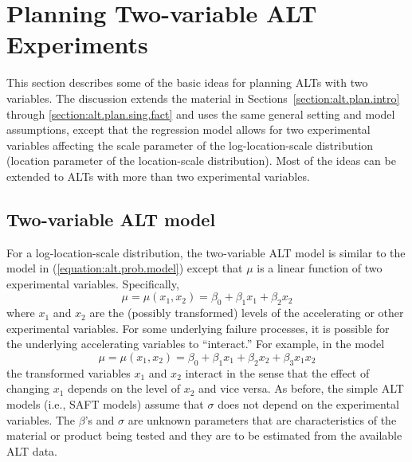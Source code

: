 \section{Planning Two-variable ALT Experiments}
\label{section:alt.plan.two.fact}

This section describes some of the basic ideas for planning ALTs with
two variables.  The discussion extends the material in
Sections~\ref{section:alt.plan.intro} through
\ref{section:alt.plan.sing.fact} and uses 
the same general setting and model assumptions, except that the
regression model allows for two experimental variables affecting the
scale parameter of the log-location-scale distribution (location
parameter of the location-scale distribution).  Most of the ideas
can be extended to ALTs with more than two experimental variables.

\subsection{Two-variable ALT model}
For a log-location-scale distribution, the two-variable ALT model is
similar to the model in (\ref{equation:alt.prob.model}) except that
$\mu$ is a linear function of two experimental variables.
Specifically,
\begin{displaymath}
\mu  =  \mu(x_{1},x_{2})=\beta_{0}+\beta_{1} x_{1}+\beta_{2}x_{2}
\end{displaymath}
where $x_{1}$ and $x_{2}$ are the (possibly transformed) levels of the
accelerating or other experimental variables. For some underlying
failure processes,
it is possible for the underlying accelerating variables to
``interact.''
For example, in the model
\begin{displaymath}
\mu  =  \mu(x_{1},x_{2})=\beta_{0}+\beta_{1} x_{1} +\beta_{2}x_{2}+\beta_{3}x_{1}x_{2}
\end{displaymath}  
the transformed variables $x_{1}$ and $x_{2}$ interact in the sense that the
effect of changing $x_{1}$ depends on the level of $x_{2}$ and
vice versa.  As before, the simple ALT models (i.e., SAFT models)
assume that $\sigma$ does not depend on the
experimental variables.  The $\beta$'s and $\sigma$ are unknown
parameters that are characteristics of the material or product being
tested and they are to be estimated from the available ALT data.

